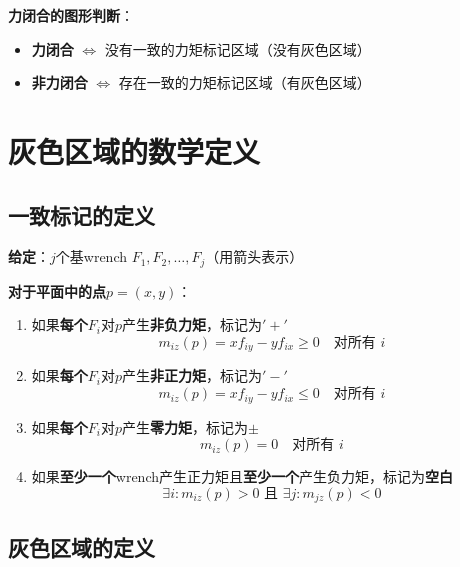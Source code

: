 \documentclass[12pt,a4paper]{article}
\begin{document}
\textbf{力闭合的图形判断}：
\begin{itemize}
\item \textbf{力闭合} $\Leftrightarrow$ 没有一致的力矩标记区域（没有灰色区域）
\item \textbf{非力闭合} $\Leftrightarrow$ 存在一致的力矩标记区域（有灰色区域）
\end{itemize}

\section{灰色区域的数学定义}

\subsection{一致标记的定义}

\textbf{给定}：$j$个基wrench $F_1, F_2, \ldots, F_j$（用箭头表示）

\textbf{对于平面中的点$p = (x, y)$}：

\begin{enumerate}
\item 如果\textbf{每个}$F_i$对$p$产生\textbf{非负力矩}，标记为$'+'$
   \begin{equation}
   m_{iz}(p) = x f_{iy} - y f_{ix} \geq 0 \quad \text{对所有 } i
   \end{equation}

\item 如果\textbf{每个}$F_i$对$p$产生\textbf{非正力矩}，标记为$'-'$
   \begin{equation}
   m_{iz}(p) = x f_{iy} - y f_{ix} \leq 0 \quad \text{对所有 } i
   \end{equation}

\item 如果\textbf{每个}$F_i$对$p$产生\textbf{零力矩}，标记为$\pm$
   \begin{equation}
   m_{iz}(p) = 0 \quad \text{对所有 } i
   \end{equation}

\item 如果\textbf{至少一个}wrench产生正力矩且\textbf{至少一个}产生负力矩，标记为\textbf{空白}
   \begin{equation}
   \exists i: m_{iz}(p) > 0 \text{ 且 } \exists j: m_{jz}(p) < 0
   \end{equation}
\end{enumerate}

\subsection{灰色区域的定义}
\end{document}
